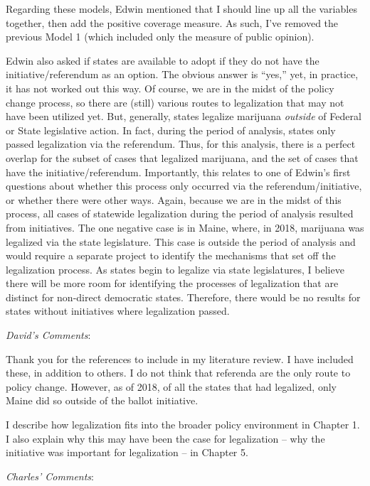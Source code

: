 \documentclass[12pt,stdletter,dateno,sigleft]{newlfm} %
\begin{document}
\begin{newlfm}
Regarding these models, Edwin mentioned that I should line up all the variables together, then add the positive coverage measure. As such, I've removed the previous Model 1 (which included only the measure of public opinion).

Edwin also asked if states are available to adopt if they do not have the initiative/referendum as an option. The obvious answer is ``yes,'' yet, in practice, it has not worked out this way. Of course, we are in the midst of the policy change process, so there are (still) various routes to legalization that may not have been utilized yet. But, generally, states legalize marijuana \textit{outside} of Federal or State legislative action. In fact, during the period of analysis, states only passed legalization via the referendum. Thus, for this analysis, there is a perfect overlap for the subset of cases that legalized marijuana, and the set of cases that have the initiative/referendum. Importantly, this relates to one of Edwin's first questions about whether this process only occurred via the referendum/initiative, or whether there were other ways. Again, because we are in the midst of this process, all cases of statewide legalization during the period of analysis resulted from initiatives. The one negative case is in Maine, where, in 2018, marijuana was legalized via the state legislature. This case is outside the period of analysis and would require a separate project to identify the mechanisms that set off the legalization process. As states begin to legalize via state legislatures, I believe there will be more room for identifying the processes of legalization that are distinct for non-direct democratic states. Therefore, there would be no results for states without initiatives where legalization passed.\newline


\textit{David's Comments}:

Thank you for the references to include in my literature review. I have included these, in addition to others. I do not think that referenda are the only route to policy change. However, as of 2018, of all the states that had legalized, only Maine did so outside of the ballot initiative. 

I describe how legalization fits into the broader policy environment in Chapter 1. I also explain why this may have been the case for legalization -- why the initiative was important for legalization -- in Chapter 5. 


\textit{Charles' Comments}:


\end{newlfm}
\end{document}
